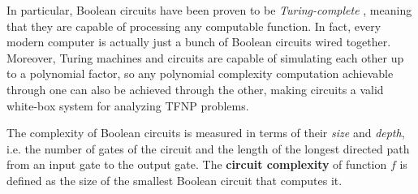 In particular, Boolean circuits have been proven to be \textit{Turing-complete} \cite{sipser_computation}, meaning that they are capable of processing any computable function. In fact, every modern computer is actually just a bunch of Boolean circuits wired together. Moreover, Turing machines and circuits are capable of simulating each other up to a polynomial factor, so any polynomial complexity computation achievable through one can also be achieved through the other, making circuits a valid white-box system for analyzing \textsf{TFNP} problems.

The complexity of Boolean circuits is measured in terms of their \textit{size} and \textit{depth}, i.e. the number of gates of the circuit and the length of the longest directed path from an input gate to the output gate. The \textbf{circuit complexity} of function $f$ is defined as the size of the smallest Boolean circuit that computes it. 

